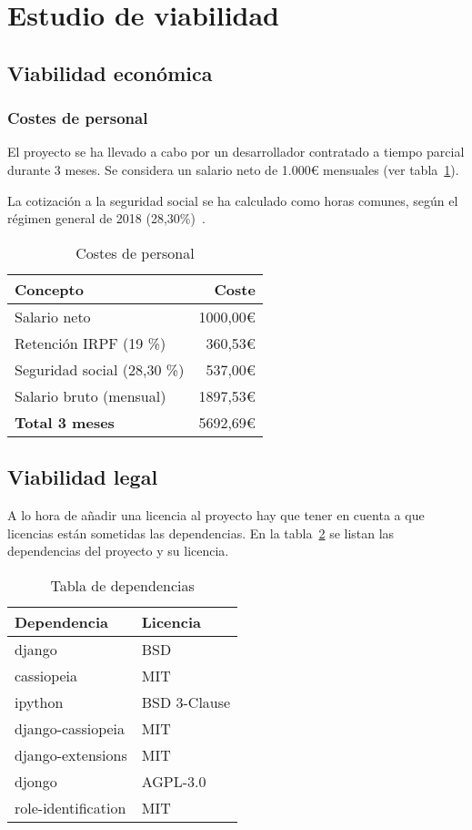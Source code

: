 \section{Estudio de viabilidad}

\subsection{Viabilidad económica}
\subsubsection{Costes de personal}
El proyecto se ha llevado a cabo por un desarrollador contratado a tiempo parcial durante 3 meses. Se considera un salario neto de 1.000€ mensuales
(ver tabla~\ref{tab:personal}).

La cotización a la seguridad social se ha calculado como horas comunes, según
el régimen general de 2018 (28,30\%)~\cite{seguridad-social}.

\begin{table}[!h]
	\centering
	\begin{tabular}{lr}
		\toprule
		\textbf{Concepto} & \textbf{Coste} \\
		\midrule
		Salario neto & 1000,00€\\
		Retención IRPF (19 \%) & 360,53€ \\
		Seguridad social (28,30 \%) & 537,00€ \\
		\midrule
		Salario bruto (mensual) & 1897,53€ \\
		\midrule
		\textbf{Total 3 meses} & 5692,69€ \\
		\bottomrule
	\end{tabular}
	\caption{Costes de personal}
	\label{tab:personal}
\end{table}

\subsection{Viabilidad legal}
A lo hora de añadir una licencia al proyecto hay que tener en cuenta a que licencias están sometidas las dependencias. En la tabla~\ref{tab:dependencias} se listan las dependencias del proyecto y su licencia.

\begin{table}[h]
	\centering
	\begin{tabular}{ll}\toprule
		\textbf{Dependencia}         & \textbf{Licencia}     \\ \midrule
		django              & BSD          \\
		cassiopeia          & MIT          \\
		ipython             & BSD 3-Clause \\
		django-cassiopeia   & MIT          \\
		django-extensions   & MIT          \\
		djongo              & AGPL-3.0     \\
		role-identification & MIT          \\ \bottomrule
	\end{tabular}
	\caption{Tabla de dependencias}
	\label{tab:dependencias}
\end{table}

